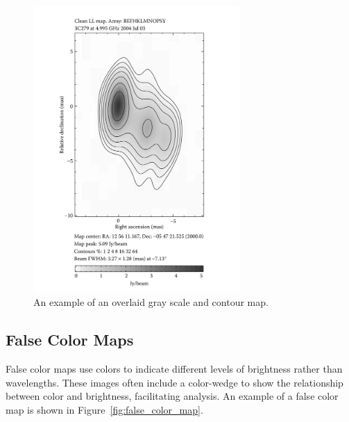 \begin{figure}[H]
    \centering
    \includegraphics[width=0.7\textwidth]{Images/gray_scale_contour_overlay.png}
    \caption{An example of an overlaid gray scale and contour map.}
    \label{fig:gray_scale_contour_overlay}
\end{figure}

\subsection{False Color Maps}

False color maps use colors to indicate different levels of brightness rather than wavelengths. These images often include a color-wedge to show the relationship between color and brightness, facilitating analysis. An example of a false color map is shown in Figure~\ref{fig:false_color_map}.

